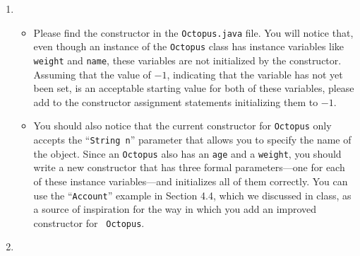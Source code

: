 \begin{enumerate}
\item

\begin{itemize}


  \item Please find the constructor in the {\tt Octopus.java} file.  You will notice that, even though an instance of
    the {\tt Octopus} class has instance variables like {\tt weight} and {\tt name}, these variables are not initialized
    by the constructor. Assuming that the value of $-1$, indicating that the variable has not yet been set, is an
    acceptable starting value for both of these variables, please add to the constructor assignment statements
    initializing them to $-1$.


  \item You should also notice that the current constructor for {\tt Octopus} only accepts the ``{\tt String n}''
    parameter that allows you to specify the name of the object.  Since an {\tt Octopus} also has an {\tt age} and a
    {\tt weight}, you should write a new constructor that has three formal parameters---one for each of these instance
    variables---and initializes all of them correctly. You can use the ``{\tt Account}'' example in Section 4.4, which
    we discussed in class, as a source of inspiration for the way in which you add an improved constructor for {\tt
    Octopus}.

\end{itemize}


\item
\begin{itemize}


\end{itemize}
\end{enumerate}
